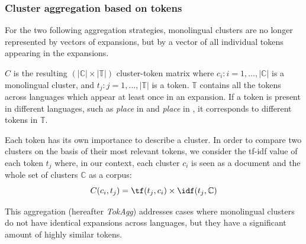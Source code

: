 \documentclass[output=paper]{langsci/langscibook}
\begin{document}
\subsubsection{Cluster aggregation based on tokens}

\label{jac:cluster representation}

For the two following aggregation strategies, monolingual clusters are
no lon\-ger represented by vectors of expansions, but by a vector of all
individual tokens appearing in the expansions.

$C$ is the resulting $(|\mathbb{C}| \times |\mathbb{T}|)$
cluster-token matrix where $c_i : i = 1,\ldots{},|\mathbb{C}|$ is a
monolingual cluster, and $t_j : j = 1,\ldots{},|\mathbb{T}|$ is a
token. $\mathbb{T}$ contains all the tokens across languages which
appear at least once in an expansion.  If a token is present in
different languages, such as \textit{place} in  and
\textit{place} in , it corresponds to different tokens in
$\mathbb{T}$.

Each token has its own importance to describe a cluster. In order to
compare two clusters on the basis of their most relevant tokens, we
consider the tf-idf value of each token $t_j$ where, in our context,
each cluster $c_i$ is seen as a document and the whole set of clusters
$\mathbb{C}$ as a corpus:
\begin{equation}\label{jac:eq:tfidf}
C(c_i,t_j) = \tf(t_j,c_i) \times \idf(t_j,\mathbb{C})
\end{equation}

\label{jac:similar}

This aggregation (hereafter \textit{TokAgg}) addresses cases where 
monolingual clusters do not have identical expansions across languages, but they 
have a significant amount of highly similar tokens.


\end{document}
